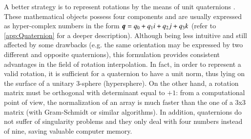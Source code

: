 A better strategy is to represent rotations by the means of unit quaternions \cite{hamilton1844ii}. These mathematical objects possess four components and are usually expressed as hyper-complex numbers in the form ${\boldsymbol{q}} = q_0 + q_{1} i + q_{2} j + q_{3} k$ (refer to \ref{app:Quaternion} for a deeper description). Although being less intuitive and still affected by some drawbacks (e.g. the same orientation may be expressed by two different and opposite quaternions), this formulation provides consistent advantages in the field of rotation interpolation. In fact, in order to represent a valid rotation, it is sufficient for a quaternion to have a unit norm, thus lying on the surface of a unitary 3-sphere (hypersphere). On the other hand, a rotation matrix must be orthogonal with determinant equal to $+1$: from a computational point of view, the normalization of an array is much faster than the one of a 3x3 matrix (with Gram-Schmidt or similar algorithms). In addition, quaternions do not suffer of singularity problems and they only deal with four numbers instead of nine, saving valuable computer memory.

